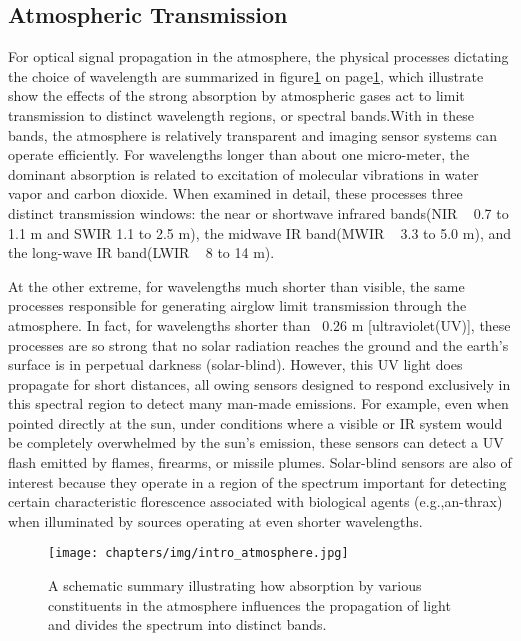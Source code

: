 \subsection{Atmospheric Transmission}
\label{introAtmospheric}
For optical signal propagation in the atmosphere, the physical processes dictating the choice of wavelength are summarized in figure\ref{fig:intro_atmosphere} on page\ref{fig:intro_atmosphere}, which illustrate show the effects of the strong absorption by atmospheric gases act to limit transmission to distinct wavelength regions, or spectral bands.With in these bands, the atmosphere is relatively transparent and imaging sensor systems can operate efficiently. For wavelengths longer than about one micro-meter, the dominant absorption is related to excitation of molecular vibrations in water vapor and carbon dioxide. When examined in detail, these processes three distinct transmission windows: the near or shortwave infrared bands(NIR \lambda ~ 0.7 to 1.1 \mu m and SWIR 1.1 to 2.5 \mu m), the midwave IR band(MWIR \lambda ~ 3.3 to 5.0 \mu m), and the long-wave IR band(LWIR \lambda ~ 8 to 14 \mu m).

At the other extreme, for wavelengths much shorter than visible, the same processes responsible for generating airglow limit transmission through the atmosphere. In fact, for wavelengths shorter than ~0.26 \mu m [ultraviolet(UV)], these processes are so strong that no solar radiation reaches the ground and the earth's surface is in perpetual darkness (solar-blind). However, this UV light does propagate for short distances, all owing sensors designed to respond exclusively in this spectral region to detect many man-made emissions. For example, even when pointed directly at the sun, under conditions where a visible or IR system would be completely overwhelmed by the sun's emission, these sensors can detect a UV flash emitted by flames, firearms, or missile plumes. Solar-blind sensors are also of interest because they operate in a region of the spectrum important for detecting certain characteristic florescence associated with biological agents (e.g.,an-thrax) when illuminated by sources operating at even shorter wavelengths. 


\begin{figure}
\centering
\texttt{[image: chapters/img/intro\_atmosphere.jpg]}
\caption{A schematic summary illustrating how absorption by various constituents in the atmosphere influences the propagation of light and divides the spectrum into distinct bands.}
\label{fig:intro_atmosphere}
\end{figure}